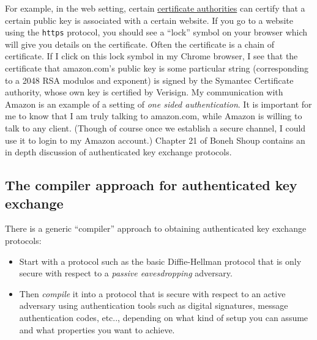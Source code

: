 For example, in the web setting, certain
\href{https://en.wikipedia.org/wiki/Certificate_authority}{certificate
authorities} can certify that a certain public key is associated with a
certain website. If you go to a website using the \texttt{https}
protocol, you should see a ``lock'' symbol on your browser which will
give you details on the certificate. Often the certificate is a chain of
certificate. If I click on this lock symbol in my Chrome browser, I see
that the certificate that amazon.com's public key is some particular
string (corresponding to a 2048 RSA modulos and exponent) is signed by
the Symantec Certificate authority, whose own key is certified by
Verisign. My communication with Amazon is an example of a setting of
\emph{one sided authentication}. It is important for me to know that I
am truly talking to amazon.com, while Amazon is willing to talk to any
client. (Though of course once we establish a secure channel, I could
use it to login to my Amazon account.) Chapter 21 of Boneh Shoup
contains an in depth discussion of authenticated key exchange protocols.


\subsection{The compiler approach for authenticated key
exchange}\label{The-compiler-approach-for}

There is a generic ``compiler'' approach to obtaining authenticated key
exchange protocols:

\begin{itemize}
\item
  Start with a protocol such as the basic Diffie-Hellman protocol that
  is only secure with respect to a \emph{passive eavesdropping}
  adversary.
\item
  Then \emph{compile} it into a protocol that is secure with respect to
  an active adversary using authentication tools such as digital
  signatures, message authentication codes, etc.., depending on what
  kind of setup you can assume and what properties you want to achieve.
\end{itemize}

